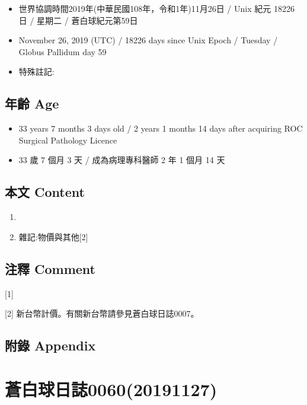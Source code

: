 \documentclass[a5paper, 12pt
]{book}
\providecommand{\tightlist}{%
  \setlength{\itemsep}{0pt}\setlength{\parskip}{0pt}}
\begin{document}
\begin{itemize}
\tightlist
\item
  世界協調時間2019年(中華民國108年，令和1年)11月26日 / Unix 紀元 18226
  日 / 星期二 / 蒼白球紀元第59日
\item
  November 26, 2019 (UTC) / 18226 days since Unix Epoch / Tuesday /
  Globus Pallidum day 59
\item
  特殊註記:
\end{itemize}

\hypertarget{ux5e74ux9f61-age-58}{%
\subsection{年齡 Age}\label{ux5e74ux9f61-age-58}}

\begin{itemize}
\tightlist
\item
  33 years 7 months 3 days old / 2 years 1 months 14 days after
  acquiring ROC Surgical Pathology Licence
\item
  33 歲 7 個月 3 天 / 成為病理專科醫師 2 年 1 個月 14 天
\end{itemize}

\hypertarget{ux672cux6587-content-58}{%
\subsection{本文 Content}\label{ux672cux6587-content-58}}

\begin{enumerate}
\def\labelenumi{\arabic{enumi}.}
\item
\item
  雜記:物價與其他{[}2{]}
\end{enumerate}

\hypertarget{ux6ce8ux91cb-comment-52}{%
\subsection{注釋 Comment}\label{ux6ce8ux91cb-comment-52}}

{[}1{]}

{[}2{]} 新台幣計價。有關新台幣請參見蒼白球日誌0007。

\hypertarget{ux9644ux9304-appendix-51}{%
\subsection{附錄 Appendix}\label{ux9644ux9304-appendix-51}}

\hypertarget{ux84bcux767dux7403ux65e5ux8a8c006020191127}{%
\section{蒼白球日誌0060(20191127)}\label{ux84bcux767dux7403ux65e5ux8a8c006020191127}}
\end{document}
